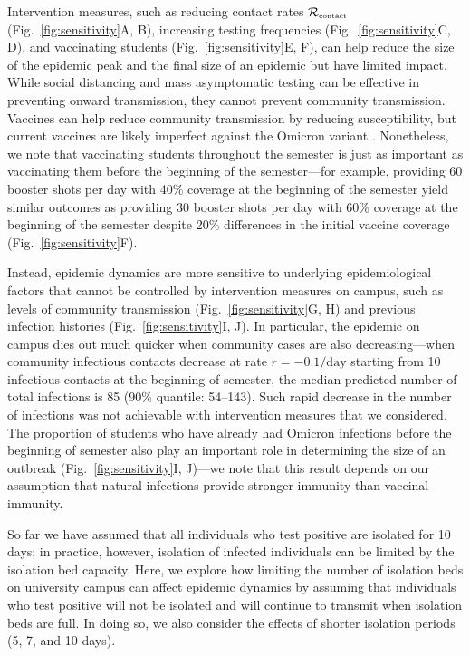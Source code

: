 \documentclass[12pt]{article}
\newcommand{\fref}[1]{Fig.~\ref{fig:#1}}
\newcommand{\Rx}[1]{\ensuremath{{\mathcal R}_{#1}}}
\newcommand{\Rc}{\Rx{\textrm{\tiny{contact}}}}
\begin{document}
Intervention measures, such as reducing contact rates $\Rc$ (\fref{sensitivity}A, B), increasing testing frequencies (\fref{sensitivity}C, D), and vaccinating students (\fref{sensitivity}E, F), can help reduce the size of the epidemic peak and the final size of an epidemic but have limited impact.
While social distancing and mass asymptomatic testing can be effective in preventing onward transmission, they cannot prevent community transmission.
Vaccines can help reduce community transmission by reducing susceptibility, but current vaccines are likely imperfect against the Omicron variant \citep{ferguson2021report}.
Nonetheless, we note that vaccinating students throughout the semester is just as important as vaccinating them before the beginning of the semester---for example, providing 60 booster shots per day with 40\% coverage at the beginning of the semester yield similar outcomes as providing 30 booster shots per day with 60\% coverage at the beginning of the semester despite 20\% differences in the initial vaccine coverage (\fref{sensitivity}F).

Instead, epidemic dynamics are more sensitive to underlying epidemiological factors that cannot be controlled by intervention measures on campus, such as levels of community transmission (\fref{sensitivity}G, H) and previous infection histories (\fref{sensitivity}I, J).
In particular, the epidemic on campus dies out much quicker when community cases are also decreasing---when community infectious contacts decrease at rate $r=-0.1/\textrm{day}$ starting from 10 infectious contacts at the beginning of semester, the median predicted number of total infections is 85 (90\% quantile: 54--143).
Such rapid decrease in the number of infections was not achievable with intervention measures that we considered.  
The proportion of students who have already had Omicron infections before the beginning of semester also play an important role in determining the size of an outbreak (\fref{sensitivity}I, J)---we note that this result depends on our assumption that natural infections provide stronger immunity than vaccinal immunity.

So far we have assumed that all individuals who test positive are isolated for 10 days;
in practice, however, isolation of infected individuals can be limited by the isolation bed capacity.
Here, we explore how limiting the number of isolation beds on university campus can affect epidemic dynamics by assuming that individuals who test positive will not be isolated and will continue to transmit when isolation beds are full.
In doing so, we also consider the effects of shorter isolation periods (5, 7, and 10 days).
\end{document}
